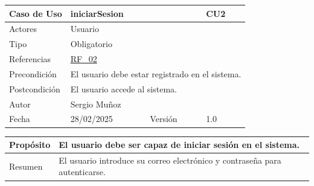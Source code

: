 \begin{table}[H]
    \centering
    \begin{tabular}{| m{} | m{} | m{} | m{} |}
        \hline
        \rowcolor[HTML]{C0C0C0} Caso de Uso & \multicolumn{2}{|m{0.43\textwidth}|}{iniciarSesion} &  CU2\\ 
        \hline
        Actores & \multicolumn{3}{l|}{Usuario} \\ 
        \hline
        Tipo & \multicolumn{3}{l|}{Obligatorio} \\ 
        \hline
        Referencias & \multicolumn{3}{l|}{\hyperref[req:RF02]{RF\_02}} \\ 
        \hline
        Precondición & \multicolumn{3}{l|}{El usuario debe estar registrado en el sistema.} \\ 
        \hline
        Postcondición & \multicolumn{3}{l|}{El usuario accede al sistema.} \\ 
        \hline
        Autor & \multicolumn{3}{l|}{Sergio Muñoz} \\ 
        \hline
        Fecha & 28/02/2025 & Versión & 1.0 \\
        \hline
    \end{tabular}
\end{table}

\begin{table}[H]
    \centering
    \begin{tabular}{| m{} | m{} | m{} | m{} |}
        \hline
        Propósito & \multicolumn{3}{m{0.67\textwidth}|}{El usuario debe ser capaz de iniciar sesión en el sistema.}   \\ 
        \hline
        Resumen & \multicolumn{3}{m{0.67\textwidth}|}{El usuario introduce su correo electrónico y contraseña para autenticarse.} \\ 
        \hline
    \end{tabular}
\end{table}



